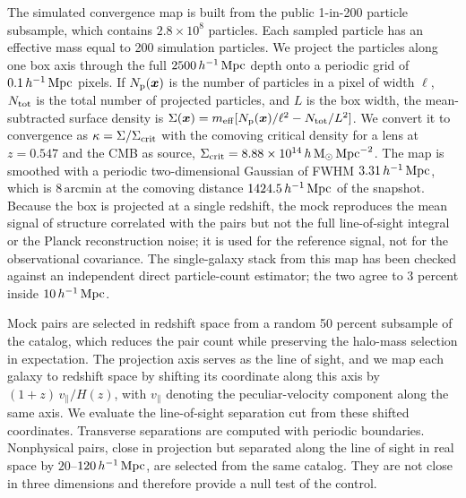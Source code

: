 The simulated convergence map is built from the public 1-in-200 particle
subsample, which contains $2.8\times10^{8}$ particles. Each sampled particle
has an effective mass equal to 200 simulation particles. We project the
particles along one box axis through
the full $2500\,h^{-1}\,{\rm Mpc}$ depth onto a periodic grid of $0.1\,h^{-1}\,{\rm Mpc}$
pixels. If $N_{\rm p}(\boldsymbol{x})$ is the number of particles in a pixel
of width $\ell$, $N_{\rm tot}$ is the total number of projected particles,
and $L$ is the box width, the mean-subtracted surface density is
$\Sigma(\boldsymbol{x})=m_{\rm eff}[N_{\rm p}(\boldsymbol{x})/\ell^{2}
-N_{\rm tot}/L^{2}]$. We convert it to convergence as
$\kappa=\Sigma/\Sigma_{\rm crit}$ with the comoving critical density for a
lens at $z=0.547$ and the CMB as source,
$\Sigma_{\rm crit}=8.88\times10^{14}\,h\,\mathrm{M}_{\odot}\,\mathrm{Mpc}^{-2}$.
The map is smoothed with a periodic two-dimensional Gaussian of FWHM
$3.31\,h^{-1}\,{\rm Mpc}$, which is $8\,\mathrm{arcmin}$ at the comoving distance
$1424.5\,h^{-1}\,{\rm Mpc}$ of the snapshot. Because the box is projected at a single
redshift, the mock reproduces the mean signal of structure correlated with
the pairs but not the full line-of-sight integral or the Planck
reconstruction noise; it is used for the reference signal, not for the
observational covariance. The single-galaxy stack from this map has been
checked against an independent direct particle-count estimator; the two
agree to 3 percent inside $10\,h^{-1}\,{\rm Mpc}$.

Mock pairs are selected in redshift space from a random 50 percent subsample
of the catalog, which reduces the pair count while preserving the halo-mass
selection in expectation. The projection axis serves as the line of sight,
and we map each galaxy to redshift space by shifting its coordinate along
this axis by $(1+z)\,v_{\parallel}/H(z)$, with $v_{\parallel}$ denoting the
peculiar-velocity component along the same axis. We evaluate the
line-of-sight separation cut from these shifted coordinates. Transverse
separations are computed with periodic boundaries.
Nonphysical pairs, close in projection but separated along the line of
sight in real space by $20$--$120\,h^{-1}\,{\rm Mpc}$, are selected from the same
catalog. They are not close in three dimensions and therefore provide a null
test of the control.

